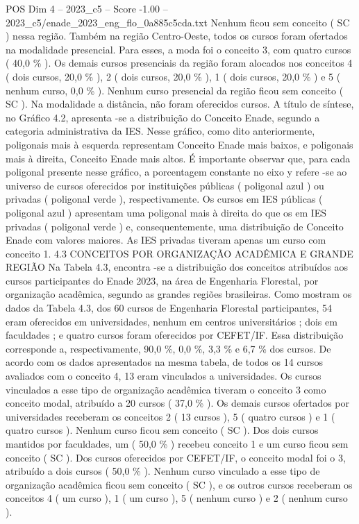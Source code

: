 \begin{textsample}{POS Dim 4 – 2023\_c5 – Score -1.00 – 2023\_c5/enade\_2023\_eng\_flo\_0a885c5cda.txt}
Nenhum ficou sem conceito ( SC ) nessa região.
Também na região Centro-Oeste, todos os cursos foram ofertados na modalidade presencial.
Para esses, a moda foi o conceito 3, com quatro cursos ( 40,0 \% ).
Os demais cursos presenciais da região foram alocados nos conceitos 4 ( dois cursos, 20,0 \% ), 2 ( dois cursos, 20,0 \% ), 1 ( dois cursos, 20,0 \% ) e 5 ( nenhum curso, 0,0 \% ).
Nenhum curso presencial da região ficou sem conceito ( SC ).
Na modalidade a distância, não foram oferecidos cursos.
A título de síntese, no Gráfico 4.2, apresenta -se a distribuição do Conceito Enade, segundo a categoria administrativa da IES.
Nesse gráfico, como dito anteriormente, poligonais mais à esquerda representam Conceito Enade mais baixos, e poligonais mais à direita, Conceito Enade mais altos.
É importante observar que, para cada poligonal presente nesse gráfico, a porcentagem constante no eixo y refere -se ao universo de cursos oferecidos por instituições públicas ( poligonal azul ) ou privadas ( poligonal verde ), respectivamente.
Os cursos em IES públicas ( poligonal azul ) apresentam uma poligonal mais à direita do que os em IES privadas ( poligonal verde ) e, consequentemente, uma distribuição de Conceito Enade com valores maiores.
As IES privadas tiveram apenas um curso com conceito 1. 4.3 CONCEITOS POR ORGANIZAÇÃO ACADÊMICA E GRANDE REGIÃO Na Tabela 4.3, encontra -se a distribuição dos conceitos atribuídos aos cursos participantes do Enade 2023, na área de Engenharia Florestal, por organização acadêmica, segundo as grandes regiões brasileiras.
Como mostram os dados da Tabela 4.3, dos 60 cursos de Engenharia Florestal participantes, 54 eram oferecidos em universidades, nenhum em centros universitários ; dois em faculdades ; e quatro cursos foram oferecidos por CEFET/IF.
Essa distribuição corresponde a, respectivamente, 90,0 \%, 0,0 \%, 3,3 \% e 6,7 \% dos cursos.
De acordo com os dados apresentados na mesma tabela, de todos os 14 cursos avaliados com o conceito 4, 13 eram vinculados a universidades.
Os cursos vinculados a esse tipo de organização acadêmica tiveram o conceito 3 como conceito modal, atribuído a 20 cursos ( 37,0 \% ).
Os demais cursos ofertados por universidades receberam os conceitos 2 ( 13 cursos ), 5 ( quatro cursos ) e 1 ( quatro cursos ).
Nenhum curso ficou sem conceito ( SC ).
Dos dois cursos mantidos por faculdades, um ( 50,0 \% ) recebeu conceito 1 e um curso ficou sem conceito ( SC ).
Dos cursos oferecidos por CEFET/IF, o conceito modal foi o 3, atribuído a dois cursos ( 50,0 \% ).
Nenhum curso vinculado a esse tipo de organização acadêmica ficou sem conceito ( SC ), e os outros cursos receberam os conceitos 4 ( um curso ), 1 ( um curso ), 5 ( nenhum curso ) e 2 ( nenhum curso ).

\end{textsample}
